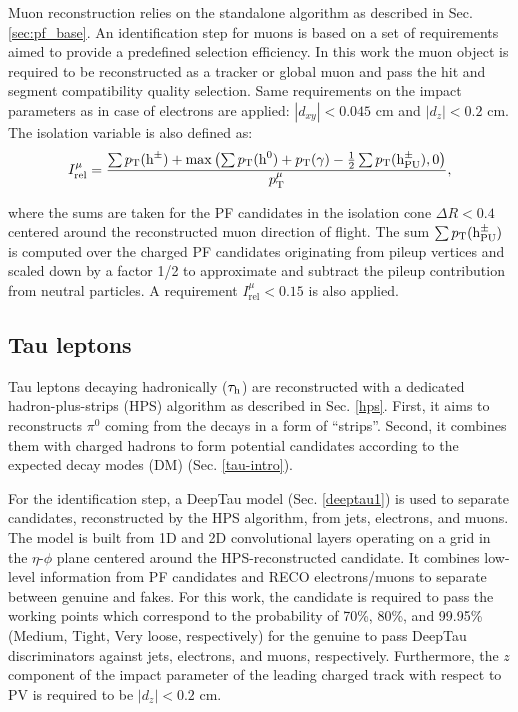 Muon reconstruction relies on the standalone algorithm as described in Sec. \ref{sec:pf_base}. An identification step for muons is based on a set of requirements aimed to provide a predefined selection efficiency. In this work the muon object is required to be reconstructed as a tracker or global muon and pass the hit and segment compatibility quality selection. Same requirements on the impact parameters as in case of electrons are applied: $|d_{xy}| < 0.045$ cm and $|d_z| < 0.2$ cm. The isolation variable is also defined as:
\begin{equation}\label{eq:iso_mu}
    I^\mu_{\text{rel}} = \dfrac{\sum p_{\text{T}}(\text{h}^\pm) + \max\left(\sum p_{\text{T}}(\text{h}^0) + p_{\text{T}}(\gamma) - \frac{1}{2}\sum p_{\text{T}}(\text{h}^\pm_{\text{PU}}), 0\right)}{p_{\text{T}}^\mu},
\end{equation}

where the sums are taken for the PF candidates in the isolation cone $\Delta R < 0.4$ centered around the reconstructed muon direction of flight. The sum $\sum p_{\text{T}}(\text{h}^\pm_{\text{PU}})$ is computed over the charged PF candidates originating from pileup vertices and scaled down by a factor 1/2 to approximate and subtract the pileup contribution from neutral particles. A requirement $I^\mu_{\text{rel}} < 0.15$ is also applied.  

\subsection{Tau leptons}\label{sec:reco_tau}
Tau leptons decaying hadronically ($\tau_\mathrm{h}$) are reconstructed with a dedicated hadron-plus-strips (HPS) algorithm as described in Sec. \ref{hps}. First, it aims to reconstructs $\pi^0$ coming from the \tauh decays in a form of \enquote{strips}. Second, it combines them with charged hadrons to form potential \tauh candidates according to the expected decay modes (DM) (Sec. \ref{tau-intro}).

For the identification step, a DeepTau model (Sec. \ref{deeptau1}) is used to separate \tauh candidates, reconstructed by the HPS algorithm, from jets, electrons, and muons. The model is built from 1D and 2D convolutional layers operating on a grid in the $\eta$-$\phi$ plane centered around the HPS-reconstructed \tauh candidate. It combines low-level information from PF candidates and RECO electrons/muons to  separate between genuine \tauh and fakes. For this work, the \tauh candidate is required to pass the working points which correspond to the probability of 70\%, 80\%, and 99.95\% (Medium, Tight, Very loose, respectively) for the genuine \tauh to pass DeepTau discriminators against jets, electrons, and muons, respectively. Furthermore, the $z$ component of the impact parameter of the leading charged track with respect to PV is required to be $|d_z| < 0.2$ cm.

